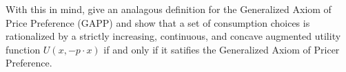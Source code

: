 With this in mind, \citet{RPPs} give an analagous definition for the Generalized Axiom of Price Preference (GAPP) and show that a set of consumption choices is rationalized by a strictly increasing, continuous, and concave augmented utility function $U(x, -p \cdot x)$ if and only if it satifies the Generalized Axiom of Pricer Preference.


